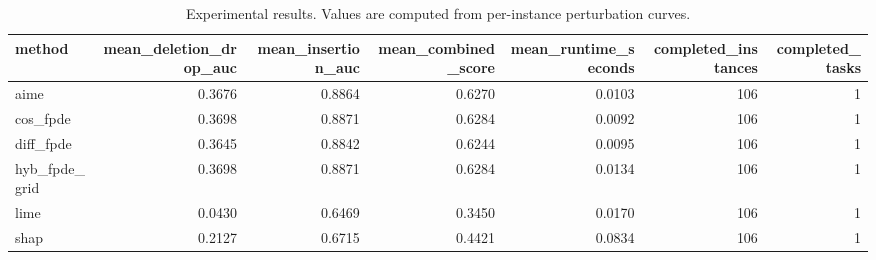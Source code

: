 \begin{table}[t]
\caption{Experimental results. Values are computed from per-instance perturbation curves.}
\label{tab:main_results_computed}
\centering
\begin{tabular}{lrrrrrr}
\toprule
method & mean\_deletion\_drop\_auc & mean\_insertion\_auc & mean\_combined\_score & mean\_runtime\_seconds & completed\_instances & completed\_tasks \\
\midrule
aime & 0.3676 & 0.8864 & 0.6270 & 0.0103 & 106 & 1 \\
cos\_fpde & 0.3698 & 0.8871 & 0.6284 & 0.0092 & 106 & 1 \\
diff\_fpde & 0.3645 & 0.8842 & 0.6244 & 0.0095 & 106 & 1 \\
hyb\_fpde\_grid & 0.3698 & 0.8871 & 0.6284 & 0.0134 & 106 & 1 \\
lime & 0.0430 & 0.6469 & 0.3450 & 0.0170 & 106 & 1 \\
shap & 0.2127 & 0.6715 & 0.4421 & 0.0834 & 106 & 1 \\
\bottomrule
\end{tabular}

\end{table}
